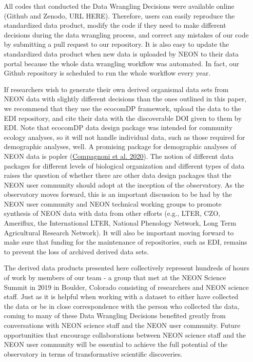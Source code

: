\documentclass[
  12pt,
]{article}
\begin{document}
All codes that conducted the Data Wrangling Decisions were available online (Github and Zenodo, URL HERE). Therefore, users can easily reproduce the standardized data product, modify the code if they need to make different decisions during the data wrangling process, and correct any mistakes of our code by submitting a pull request to our repository. It is also easy to update the standardized data product when new data is uploaded by NEON to their data portal because the whole data wrangling workflow was automated. In fact, our Github repository is scheduled to run the whole workflow every year.

If researchers wish to generate their own derived organismal data sets from NEON data with slightly different decisions than the ones outlined in this paper, we recommend that they use the ecocomDP framework, upload the data to the EDI repository, and cite their data with the discoverable DOI given to them by EDI. Note that ecocomDP data design package was intended for community ecology analyses, so it will not handle individual data, such as those required for demographic analyses, well. A promising package for demographic analyses of NEON data is popler (\protect\hyperlink{ref-compagnoni2020popler}{Compagnoni et al. 2020}). The notion of different data packages for different levels of biological organization and different types of data raises the question of whether there are other data design packages that the NEON user community should adopt at the inception of the observatory. As the observatory moves forward, this is an important discussion to be had by the NEON user community and NEON technical working groups to promote synthesis of NEON data with data from other efforts (e.g., LTER, CZO, Ameriflux, the International LTER, National Phenology Network, Long Term Agricultural Research Network). It will also be important moving forward to make sure that funding for the maintenance of repositories, such as EDI, remains to prevent the loss of archived derived data sets.

The derived data products presented here collectively represent hundreds of hours of work by members of our team - a group that met at the NEON Science Summit in 2019 in Boulder, Colorado consisting of researchers and NEON science staff. Just as it is helpful when working with a dataset to either have collected the data or be in close correspondence with the person who collected the data, coming to many of these Data Wrangling Decisions benefited greatly from conversations with NEON science staff and the NEON user community. Future opportunities that encourage collaborations between NEON science staff and the NEON user community will be essential to achieve the full potential of the observatory in terms of transformative scientific discoveries.
\end{document}
